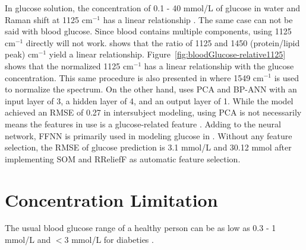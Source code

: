 In glucose solution, the concentration of 0.1 - 40 mmol/L of glucose in water and Raman shift at 1125 $\text{cm}^{-1}$ has a linear relationship \cite{solutionGlucose}.
The same case can not be said with blood glucose.
Since blood contains multiple components, using 1125 $\text{cm}^{-1}$ directly will not work. 
\cite{directGlucose} shows that the ratio of 1125 and 1450 (protein/lipid peak) $\text{cm}^{-1}$ yield a linear relationship.
Figure~\ref{fig:bloodGlucose-relative1125} shows that the normalized 1125 $\text{cm}^{-1}$ has a linear relationship with the glucose concentration.
This same procedure is also presented in \citep{solutionGlucose} where 1549 $\text{cm}^{-1}$ is used to normalize the spectrum.
On the other hand, \cite{ramanNailFold2019} uses PCA and BP-ANN with an input layer of 3, a hidden layer of 4, and an output layer of 1. 
While the model achieved an RMSE of 0.27 in intersubject modeling, using PCA is not necessarily means the features in use is a glucose-related feature \citep{directGlucose}.
Adding to the neural network, FFNN is primarily used in modeling glucose in \citep{sitecompare}. 
Without any feature selection, the RMSE of glucose prediction is 3.1 mmol/L and 30.12 mmol after implementing SOM and RReliefF as automatic feature selection.


\section{Concentration Limitation}

The usual blood glucose range of a healthy person can be as low as 0.3 - 1 mmol/L and $<$3 mmol/L for diabeties \citep{solutionGlucose}.






